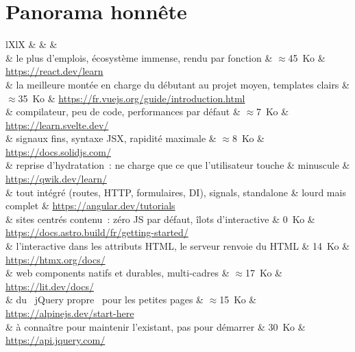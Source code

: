 \section{Panorama honn\^ete}

\begin{tabz}{lXlX}
  \headrow {} \&  \&  \&  \\
  \midrule
   \& le plus d'emplois, \'ecosyst\`eme immense, rendu par fonction \& $\approx$45~Ko \& \url{https://react.dev/learn} \\
   \& la meilleure mont\'ee en charge du d\'ebutant au projet moyen, templates clairs \& $\approx$35~Ko \& \url{https://fr.vuejs.org/guide/introduction.html} \\
   \& compilateur, peu de code, performances par d\'efaut \& $\approx$7~Ko \& \url{https://learn.svelte.dev/} \\
   \& signaux fins, syntaxe JSX, rapidit\'e maximale \& $\approx$8~Ko \& \url{https://docs.solidjs.com/} \\
   \& reprise d'hydratation~: ne charge que ce que l'utilisateur touche \& minuscule \& \url{https://qwik.dev/learn/} \\
   \& tout int\'egr\'e (routes, HTTP, formulaires, DI), signals, standalone \& lourd mais complet \& \url{https://angular.dev/tutorials} \\
   \& sites centr\'es contenu~: z\'ero JS par d\'efaut, \^ilots d'interactive \& 0~Ko \& \url{https://docs.astro.build/fr/getting-started/} \\
   \& l'interactive dans les attributs HTML, le serveur renvoie du HTML \& 14~Ko \& \url{https://htmx.org/docs/} \\
   \& web components natifs et durables, multi-cadres \& $\approx$17~Ko \& \url{https://lit.dev/docs/} \\
   \& du \og ~jQuery propre~ \fg{} pour les petites pages \& $\approx$15~Ko \& \url{https://alpinejs.dev/start-here} \\
   \& \`a conna\^itre pour maintenir l'existant, pas pour d\'emarrer \& 30~Ko \& \url{https://api.jquery.com/} \\
\end{tabz}

